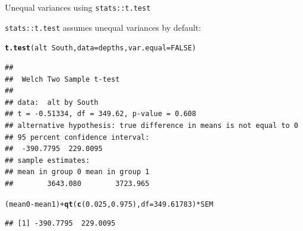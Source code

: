 \documentclass{beamer}\usepackage[]{graphicx}\usepackage[]{color}
\newcommand{\hlnum}[1]{\textcolor[rgb]{0.686,0.059,0.569}{#1}}%
\newcommand{\hlopt}[1]{\textcolor[rgb]{0,0,0}{#1}}%
\newcommand{\hlstd}[1]{\textcolor[rgb]{0.345,0.345,0.345}{#1}}%
\newcommand{\hlkwc}[1]{\textcolor[rgb]{0.333,0.667,0.333}{#1}}%
\newcommand{\hlkwd}[1]{\textcolor[rgb]{0.737,0.353,0.396}{\textbf{#1}}}%
\newenvironment{knitrout}{}{} %
\begin{document}
\begin{frame}[fragile]{Unequal variances using \texttt{stats::t.test}}

\texttt{stats::t.test} assumes unequal variances by default:


\begin{knitrout}\scriptsize
{}\color{fgcolor}
\begin{alltt}
\hlkwd{t.test}\hlstd{(alt} \hlopt{~} \hlstd{South,} \hlkwc{data} \hlstd{= depths,} \hlkwc{var.equal} \hlstd{=} \hlnum{FALSE}\hlstd{)}
\end{alltt}
\begin{verbatim}
## 
## 	Welch Two Sample t-test
## 
## data:  alt by South
## t = -0.51334, df = 349.62, p-value = 0.608
## alternative hypothesis: true difference in means is not equal to 0
## 95 percent confidence interval:
##  -390.7795  229.0095
## sample estimates:
## mean in group 0 mean in group 1 
##        3643.080        3723.965
\end{verbatim}
\begin{alltt}
\hlstd{(mean0} \hlopt{-} \hlstd{mean1)} \hlopt{+} \hlkwd{qt}\hlstd{(}\hlkwd{c}\hlstd{(}\hlnum{0.025}\hlstd{,} \hlnum{0.975}\hlstd{),} \hlkwc{df} \hlstd{=} \hlnum{349.61783}\hlstd{)} \hlopt{*} \hlstd{SEM}
\end{alltt}
\begin{verbatim}
## [1] -390.7795  229.0095
\end{verbatim}

\end{knitrout}


\end{frame}
\end{document}
